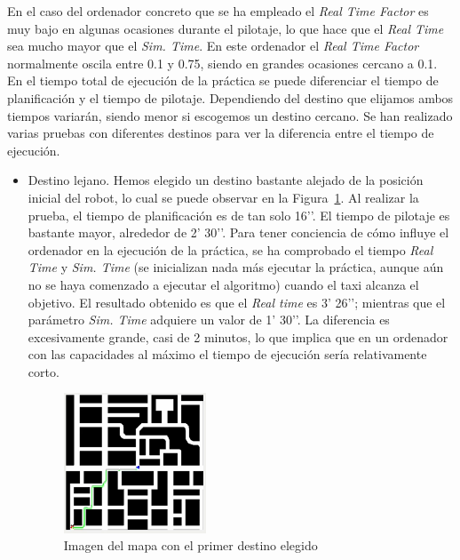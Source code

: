 En el caso del ordenador concreto que se ha empleado el \textit{Real Time Factor} es muy bajo en algunas ocasiones durante el pilotaje, lo que hace que el \textit{Real Time} sea mucho mayor que el \textit{Sim. Time}. En este ordenador el \textit{Real Time Factor} normalmente oscila entre 0.1 y 0.75, siendo en grandes ocasiones cercano a 0.1. \\

En el tiempo total de ejecución de la práctica se puede diferenciar el tiempo de planificación y el tiempo de pilotaje. Dependiendo del destino que elijamos ambos tiempos variarán, siendo menor si escogemos un destino cercano. Se han realizado varias pruebas con diferentes destinos para ver la diferencia entre el tiempo de ejecución.

\begin{itemize}
\item Destino lejano. Hemos elegido un destino bastante alejado de la posición inicial del robot, lo cual se puede observar en la Figura~\ref{fig.experimento1}. Al realizar la prueba, el tiempo de planificación es de tan solo 16’’. El tiempo de pilotaje es bastante mayor, alrededor de 2’ 30’’. Para tener conciencia de cómo influye el ordenador en la ejecución de la práctica, se ha comprobado el tiempo \textit{Real Time} y \textit{Sim. Time} (se inicializan nada más ejecutar la práctica, aunque aún no se haya comenzado a ejecutar el algoritmo) cuando el taxi alcanza el objetivo. El resultado obtenido es que el \textit{Real time} es 3’ 26’’; mientras que el parámetro \textit{Sim. Time} adquiere un valor de 1’ 30’’. La diferencia es excesivamente grande, casi de 2 minutos, lo que implica que en un ordenador con las capacidades al máximo el tiempo de ejecución sería relativamente corto.

\begin{figure}[H]
  \begin{center}
    \includegraphics[width=0.4\textwidth]{figures/GPP/Experimento1.png}
		\caption{Imagen del mapa con el primer destino elegido}
		\label{fig.experimento1}
		\end{center}
\end{figure}


\end{itemize}
